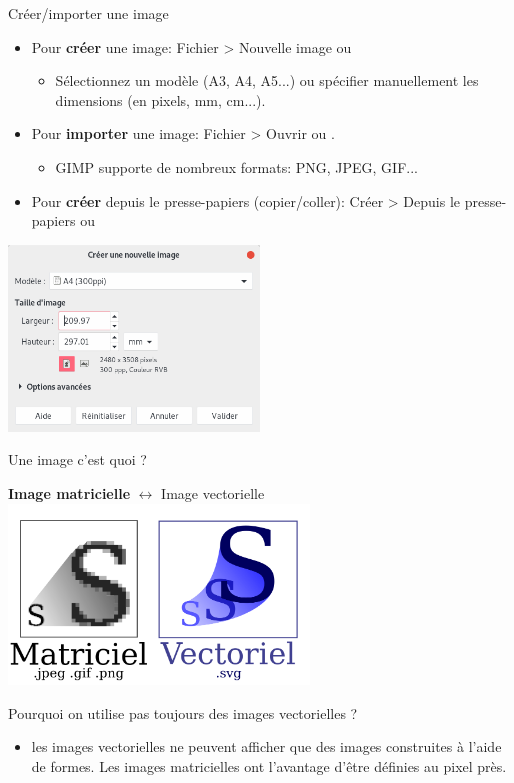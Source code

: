 \documentclass[10pt,svgnames,usenames,table]{beamer}
\begin{document}
\begin{frame}{Créer/importer une image}
	\begin{itemize}
		\item Pour \textbf{créer} une image: Fichier > Nouvelle image ou 
			\begin{itemize}
				\item Sélectionnez un modèle (A3, A4, A5...) ou spécifier manuellement les dimensions (en pixels, mm, cm...).
			\end{itemize}
		\item Pour \textbf{importer} une image: Fichier  > Ouvrir ou .
			\begin{itemize}
				\item GIMP supporte de nombreux formats: PNG, JPEG, GIF...
			\end{itemize}
		\item Pour \textbf{créer} depuis le presse-papiers (copier/coller): Créer > Depuis le presse-papiers ou 
	\end{itemize}
	\begin{center}
		\includegraphics[width=0.5\textwidth]{Images/new_image.png}
	\end{center}
\end{frame}

\begin{frame}{Une image c'est quoi ?}
	\begin{center} 
		\textbf{Image matricielle} $\leftrightarrow$ Image vectorielle 
		\includegraphics[width=0.6\textwidth]{Images/mat_vs_vec}
	\end{center}
	Pourquoi on utilise pas toujours des images vectorielles ? 
	\begin{itemize}
		\item les images vectorielles ne peuvent afficher que des images construites à l'aide de formes. Les images matricielles ont l'avantage d'être définies au pixel près.
	\end{itemize}
\end{frame}
\end{document}
